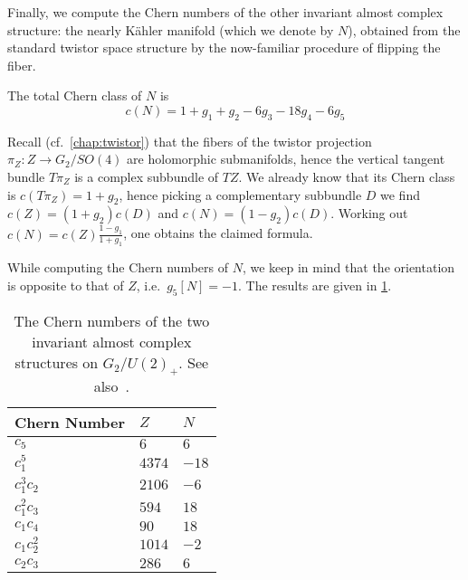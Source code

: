 Finally, we compute the Chern numbers of the other invariant almost complex structure: the nearly K\"ahler manifold (which we denote by $N$), obtained from the standard twistor space structure by the now-familiar procedure of flipping the fiber.

\begin{prop}
	The total Chern class of $N$ is 
	\begin{equation*}
		c(N)=1+g_1+g_2-6g_3-18 g_4-6g_5
	\end{equation*}
\end{prop}
\begin{myproof}
	Recall (cf.~\cref{chap:twistor}) that the fibers of the twistor projection $\pi_Z:Z\to G_2/SO(4)$ are holomorphic submanifolds, hence the vertical tangent bundle $T\pi_Z$ is a complex subbundle of $TZ$. We already know that its Chern class is $c(T\pi_Z)=1+g_2$, hence picking a complementary subbundle $D$ we find $c(Z)=(1+g_2)c(D)$ and $c(N)=(1-g_2)c(D)$. Working out $c(N)=c(Z)\frac{1-g_1}{1+g_1}$, one obtains the claimed formula.
\end{myproof}

While computing the Chern numbers of $N$, we keep in mind that the orientation is opposite to that of $Z$, i.e.~$g_5[N]=-1$. The results are given in \cref{tab:Znumbers}.

\begin{table}[ht!]\centering
	\begin{tabular}{lll} \toprule
		Chern Number& $Z$		& $N$ \\ \midrule
		$c_5$ 		& $6$		& $6$ \\
		$c_1^5$ 	& $4374$	& $-18$\\
		$c_1^3c_2$	& $2106$	& $-6$\\
		$c_1^2c_3$	& $594$		& $18$\\
		$c_1c_4$	& $90$		& $18$\\
		$c_1c_2^2$	& $1014$	& $-2$\\
		$c_2c_3$	& $286$		& $6$\\ \bottomrule
	\end{tabular}
	\caption{The Chern numbers of the two invariant almost complex structures on $G_2/U(2)_+$. See also~\cite{GNO2017}\protect\footnotemark.}\label{tab:Znumbers}
\end{table}\vspace{-0.1cm}
